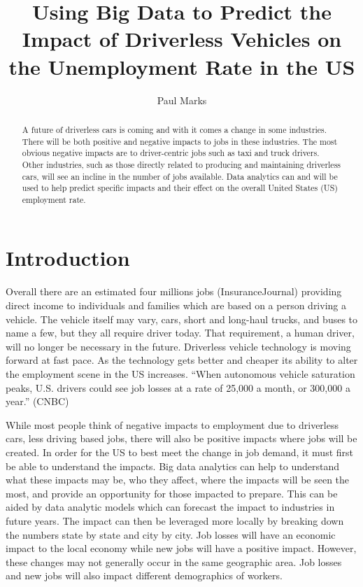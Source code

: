 \documentclass[sigconf]{acmart}
\begin{document}
\title{Using Big Data to Predict the Impact of Driverless Vehicles on the Unemployment Rate in the US}


\author{Paul Marks}


\begin{abstract}
A future of driverless cars is coming and with it comes a change in some 
industries.  There will be both positive and negative impacts to jobs in these 
industries.  The most obvious negative impacts are to driver-centric jobs such 
as taxi and truck drivers.  Other industries, such as those directly related to 
producing and maintaining driverless cars, will see an incline in the number of 
jobs available.  Data analytics can and will be used to help predict specific 
impacts and their effect on the overall United States (US) employment rate.
\end{abstract}


\maketitle

\section{Introduction}

Overall there are an estimated four millions jobs (InsuranceJournal) providing 
direct income to individuals and families which are based on a person driving a 
vehicle.  The vehicle itself may vary, cars, short and long-haul trucks, and 
buses to name a few, but they all require driver today.  That requirement, a 
human driver, will no longer be necessary in the future.  Driverless vehicle 
technology is moving forward at fast pace.  As the technology gets better and 
cheaper its ability to alter the employment scene in the US increases.  ``When 
autonomous vehicle saturation peaks, U.S. drivers could see job losses at a 
rate of 25,000 a month, or 300,000 a year.''  (CNBC)  

While most people think of negative impacts to employment due to driverless 
cars, less driving based jobs, there will also be positive impacts where jobs 
will be created.  In order for the US to best meet the change in job demand, 
it must first be able to understand the impacts.  Big data analytics can help 
to understand what these impacts may be, who they affect, where the impacts 
will be seen the most, and provide an opportunity for those impacted to 
prepare.  This can be aided by data analytic models which can forecast the 
impact to industries in future years.  The impact can then be leveraged more 
locally by breaking down the numbers state by state and city by city.  Job 
losses will have an economic impact to the local economy while new jobs will 
have a positive impact.  However, these changes may not generally occur in 
the same geographic area.  Job losses and new jobs will also impact different 
demographics of workers.
\end{document}
